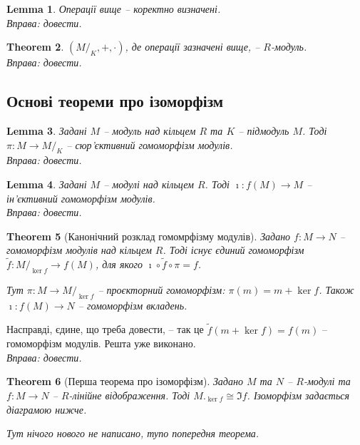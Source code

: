 \documentclass[a4paper, 10pt]{article}
\theoremstyle{theoremdd}
\newtheorem{theorem}{Theorem}[subsection]
\theoremstyle{theoremdd}
\theoremstyle{theoremdd}
\theoremstyle{theoremdd}
\theoremstyle{theoremdd}
\theoremstyle{theoremdd}
\theoremstyle{theoremdd}
\theoremstyle{theoremdd}
\theoremstyle{theoremdd}
\theoremstyle{theoremdd}
\theoremstyle{theoremdd}
\theoremstyle{theoremdd}
\theoremstyle{theoremdd}
\newtheorem{lemma}[theorem]{Lemma}
\theoremstyle{theoremdd}
\theoremstyle{theoremdd}
\begin{document}
\begin{lemma}
Операції вище -- коректно визначені.\\
\textit{Вправа: довести.}
\end{lemma}

\begin{theorem}
$(M/_K, +, \cdot)$, де операції зазначені вище, -- $R$-модуль.\\
\textit{Вправа: довести.}
\end{theorem}

\subsection{Основі теореми про ізоморфізм}
\begin{lemma}
Задані $M$ -- модуль над кільцем $R$ та $K$ -- підмодуль $M$. Тоді $\pi \colon M \to M/_K$ -- сюр'єктивний гомоморфізм модулів. \\
\textit{Вправа: довести.}
\end{lemma}

\begin{lemma}
Задані $M$ -- модулі над кільцем $R$. Тоді $\imath \colon f(M) \to M$ -- ін'єктивний гомоморфізм модулів. \\
\textit{Вправа: довести.}
\end{lemma}

\begin{theorem}[Канонічний розклад гомомрфізму модулів]
Задано $f \colon M \to N$ -- гомоморфізм модулів над кільцем $R$. Тоді існує єдиний гомоморфізм $\tilde{f} \colon M/_{\ker f} \to f(M)$, для якого $\imath \circ \tilde{f} \circ \pi = f$.
\begin{figure}[H]
\centering
{}
\end{figure}
Тут $\pi \colon M \to M/_{\ker f}$ -- проєкторний гомоморфізм: $\pi(m) = m + \ker f$. Також $\imath \colon f(M) \to N$ -- гомоморфізм вкладень.
\end{theorem}
Насправді, єдине, що треба довести, -- так це $\tilde{f}(m + \ker f) = f(m)$ -- гомоморфізм модулів. Решта уже виконано.\\
\textit{Вправа: довести.}

\begin{theorem}[Перша теорема про ізоморфізм]
Задано $M$ та $N$ -- $R$-модулі та $f \colon M \to N$ -- $R$-лінійне відображення. Тоді $M._{\ker f} \cong \Im f$. Ізоморфізм задається діаграмою нижче.
\begin{figure}[H]
\centering
{}
\end{figure}
\textit{Тут нічого нового не написано, тупо попередня теорема.}
\end{theorem}
\end{document}
